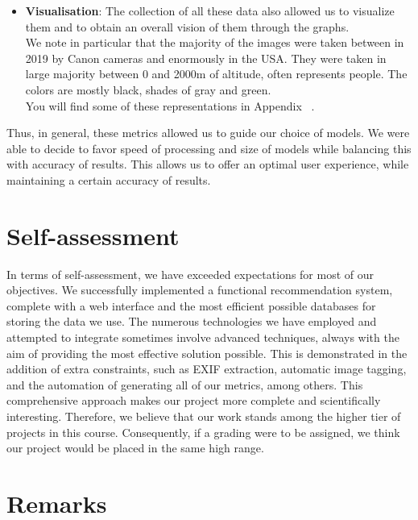 \documentclass{article}
\begin{document}
\begin{itemize}
        \item \textbf{Visualisation}: The collection of all these data also allowed us to visualize them and to obtain an overall vision of them through the graphs.\\We note in particular that the majority of the images were taken between in 2019 by Canon cameras and enormously in the USA. They were taken in large majority between 0 and 2000m of altitude, often represents people. The colors are mostly black, shades of gray and green.\\You will find some of these representations in Appendix ~\hyperref[subsec:Graphs]{}.
    \end{itemize}

    Thus, in general, these metrics allowed us to guide our choice of models.
    We were able to decide to favor speed of processing and size of models while balancing this with accuracy of results.
    This allows us to offer an optimal user experience, while maintaining a certain accuracy of results.


    \section{Self-assessment}\label{sec:self_assessment}
    In terms of self-assessment, we have exceeded expectations for most of our objectives.
    We successfully implemented a functional recommendation system, complete with a web interface and the most efficient possible databases for storing the data we use.
    The numerous technologies we have employed and attempted to integrate sometimes involve advanced techniques, always with the aim of providing the most effective solution possible.
    This is demonstrated in the addition of extra constraints, such as EXIF extraction, automatic image tagging, and the automation of generating all of our metrics, among others.
    This comprehensive approach makes our project more complete and scientifically interesting.
    Therefore, we believe that our work stands among the higher tier of projects in this course.
    Consequently, if a grading were to be assigned, we think our project would be placed in the same high range.


    \section{Remarks}\label{sec:remarks}
\end{document}

